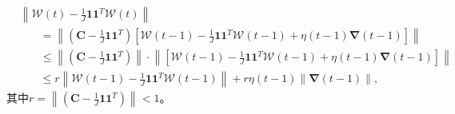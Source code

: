 \begin{equation}
    \label{DisOfWW_3}
    \begin{split}
        &\left\|\boldsymbol{\mathcal{W}}\left(t\right) - \frac{1}{J}\boldsymbol1\boldsymbol1^T\boldsymbol{\mathcal{W}}\left(t\right)\right\| \\
        &~~~~~~~~
        =\left\|\left(\boldsymbol C-\frac{1}{J}\boldsymbol1\boldsymbol1^T\right) \left[
            \boldsymbol{\mathcal{W}}\left(t-1\right) - \frac{1}{J}\boldsymbol1\boldsymbol1^T\boldsymbol{\mathcal{W}}\left(t-1\right)
            +\eta\left(t-1\right)\boldsymbol{\nabla}\left(t-1\right)
        \right]\right\|   \\
        &~~~~~~~~
        \leq\left\|\left(\boldsymbol C-\frac{1}{J}\boldsymbol1\boldsymbol1^T\right) \right\| \cdot
        \left\|\left[
            \boldsymbol{\mathcal{W}}\left(t-1\right) - \frac{1}{J}\boldsymbol1\boldsymbol1^T\boldsymbol{\mathcal{W}}\left(t-1\right)
            +\eta\left(t-1\right)\boldsymbol{\nabla}\left(t-1\right)
        \right]\right\|   \\
        &~~~~~~~~
        \leq r \left\|\boldsymbol{\mathcal{W}}\left(t-1\right) - \frac{1}{J}\boldsymbol1\boldsymbol1^T\boldsymbol {\mathcal{W}}\left(t-1\right)\right\|
        +r \eta\left(t-1\right)\left\|\boldsymbol{\nabla}\left(t-1\right)\right\| ,
    \end{split}
\end{equation}
其中$r=\left\|\left(\boldsymbol C-\frac{1}{J}\boldsymbol1\boldsymbol1^T\right) \right\|<1$。

